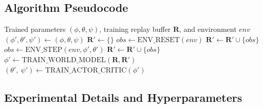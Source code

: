 \newpage

\subsection{Algorithm Pseudocode}

\begin{algorithm}[ht]
\caption{TT-MBRL, our proposed algorithm for applying model-based reinforcement learning at test time. At the beginning of each evaluation episode, the agent initializes test-time parameters $(\phi', \theta', \psi')$ from the trained parameters $(\phi, \theta, \psi)$ and creates a dedicated test-time replay buffer $\mathbf{R'}$ to collect episode observations. At each environment step, the world model is updated by sampling from both the test-time buffer $\mathbf{R'}$ and the training buffer $\mathbf{R}$, acting as a regularizer that prevents overfitting to limited early observations. The actor-critic is then updated using the adapted world model, enabling the agent to learn an improved policy.}
\begin{algorithmic}
\Require Trained parameters $(\phi, \theta, \psi)$, training replay buffer $\mathbf{R}$, and environment $env$
    \State $(\phi', \theta', \psi') \gets (\phi, \theta, \psi)$
    \State $\mathbf{R'} \gets \{\}$
    \State $obs \gets \text{ENV\_RESET}(env)$
    \State $\mathbf{R'} \gets \mathbf{R'} \cup \{obs\}$
        \State $obs \gets \text{ENV\_STEP}(env, \phi', \theta')$
        \State $\mathbf{R'} \gets \mathbf{R'} \cup \{obs\}$
        \State $\phi' \gets \text{TRAIN\_WORLD\_MODEL}(\mathbf{R}, \mathbf{R'})$
        \State $(\theta',~\psi') \gets \text{TRAIN\_ACTOR\_CRITIC}(\phi')$
    \EndWhile
\EndWhile
\end{algorithmic}
\label{algorithm:pseudocode}
\end{algorithm}

\subsection{Experimental Details and Hyperparameters}
\label{appendix:hyperparameters}

